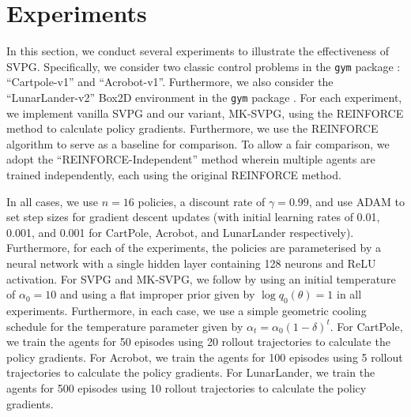 
\section{Experiments}

In this section, we conduct several experiments to illustrate the effectiveness of SVPG. Specifically, we consider two classic control problems in the \texttt{gym} package \citep{openai_gym}: ``Cartpole-v1'' and ``Acrobot-v1''. Furthermore, we also consider the ``LunarLander-v2'' Box2D environment in the \texttt{gym} package \citep{openai_gym}. For each experiment, we implement vanilla SVPG and our variant, MK-SVPG, using the REINFORCE method to calculate policy gradients. Furthermore, we use the REINFORCE algorithm to serve as a baseline for comparison. To allow a fair comparison, we adopt the ``REINFORCE-Independent'' method \citep{liu_svpg} wherein multiple agents are trained independently, each using the original REINFORCE method. 

In all cases, we use $n=16$ policies, a discount rate of $\gamma = 0.99$, and use ADAM \citep{kingma_adam} to set step sizes for gradient descent updates (with initial learning rates of 0.01, 0.001, and 0.001 for CartPole, Acrobot, and LunarLander respectively). Furthermore, for each of the experiments, the policies are parameterised by a neural network with a single hidden layer containing 128 neurons and ReLU activation. For SVPG and MK-SVPG, we follow \citet{liu_svpg} by using an initial temperature of $\alpha_0=10$ and using a flat improper prior given by $\log q_0(\theta) = 1$ in all experiments. Furthermore, in each case, we use a simple geometric cooling schedule for the temperature parameter given by $\alpha_t = \alpha_0(1 - \delta)^t$. For CartPole, we train the agents for 50 episodes using 20 rollout trajectories to calculate the policy gradients. For Acrobot, we train the agents for 100 episodes using 5 rollout trajectories to calculate the policy gradients. For LunarLander, we train the agents for 500 episodes using 10 rollout trajectories to calculate the policy gradients.

